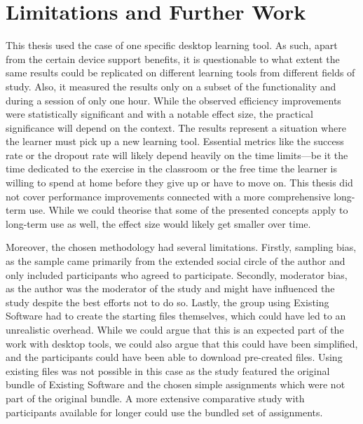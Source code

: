 \section{Limitations and Further Work}

This thesis used the case of one specific desktop learning tool.
As such, apart from the certain device support benefits, it is questionable to what extent the same results could be replicated on different learning tools from different fields of study.
Also, it measured the results only on a subset of the functionality and during a session of only one hour.
While the observed efficiency improvements were statistically significant and with a notable effect size, the practical significance will depend on the context.
The results represent a situation where the learner must pick up a new learning tool.
Essential metrics like the success rate or the dropout rate will likely depend heavily on the time limits---be it the time dedicated to the exercise in the classroom or the free time the learner is willing to spend at home before they give up or have to move on.
This thesis did not cover performance improvements connected with a more comprehensive long-term use.
While we could theorise that some of the presented concepts apply to long-term use as well, the effect size would likely get smaller over time.

Moreover, the chosen methodology had several limitations.
Firstly, sampling bias, as the sample came primarily from the extended social circle of the author and only included participants who agreed to participate.
Secondly, moderator bias, as the author was the moderator of the study and might have influenced the study despite the best efforts not to do so.
Lastly, the group using Existing Software had to create the starting files themselves, which could have led to an unrealistic overhead.
While we could argue that this is an expected part of the work with desktop tools, we could also argue that this could have been simplified, and the participants could have been able to download pre-created files.
Using existing files was not possible in this case as the study featured the original bundle of Existing Software and the chosen simple assignments which were not part of the original bundle.
A more extensive comparative study with participants available for longer could use the bundled set of assignments.

